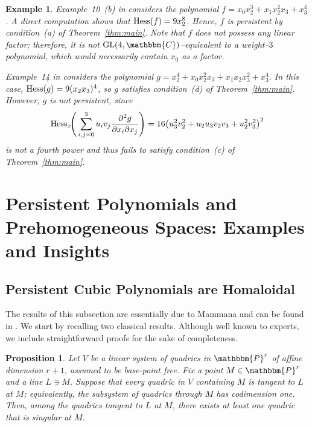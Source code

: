 \documentclass[aps,floatfix,groupedaddress,superscriptaddress,longbibliography,footinbib,notitlepage,showpacs]{revtex4-1}
\def\Hess{{\rm Hess}}
\newtheorem{proposition}[theorem]{Proposition}
\newtheorem{example}[theorem]{Example}
\begin{document}
\begin{example}\label{exa:SolT}
Example~10~(b) in \cite{SolT} considers the polynomial $f = x_0x_2^3 + x_1x_2^2x_3 + x_3^4$. A direct computation shows that $\Hess(f) = 9x_2^8$. Hence, $f$ is persistent by condition~\textnormal{(a)} of Theorem~\ref{thm:main}. Note that $f$ does not possess any linear factor; therefore, it is not 
$\mathrm{GL}(4,\mathbbm{C})$–equivalent to a weight–$3$ polynomial, which would necessarily contain $x_0$ as a factor.

Example~14 in \cite{SolT} considers the polynomial $g = x_2^4 + x_0x_2^2x_3 + x_1x_2x_3^2 + x_3^4$. In this case, $\Hess(g) = 9(x_2x_3)^4$, so $g$ satisfies condition~\textnormal{(d)} of Theorem~\ref{thm:main}. However, $g$ is not persistent, since
\[
\Hess_x\!\Bigg(\sum_{i,j=0}^3 u_i v_j 
\frac{\partial^2 g}{\partial x_i \partial x_j}\Bigg)
= 16\big(u_3^2 v_2^2 + u_2u_3v_2v_3 + u_2^2v_3^2\big)^2
\]
is not a fourth power and thus fails to satisfy condition~\textnormal{(c)} of Theorem~\ref{thm:main}.
\end{example}
\section{Persistent Polynomials and Prehomogeneous Spaces: Examples and Insights}\label{sec.v}


\subsection{Persistent Cubic Polynomials are Homaloidal }

The results of this subsection are essentially due to Mammana and can be found in \cite[n.6]{Mam}.
We start by recalling two classical results. Although well known to experts, we include straightforward proofs for the sake of completeness.

\begin{proposition}\label{prop:contains_line}
Let $V$ be a linear system of quadrics in $\mathbbm{P}^r$ of affine dimension $r+1$, assumed to be base-point free. Fix a point $M\in\mathbbm{P}^r$ and a line $L\ni M$. Suppose that every quadric in $V$ containing $M$ is tangent to $L$ at $M$; equivalently, the subsystem of quadrics through $M$ has codimension one. Then, among the quadrics tangent to $L$ at $M$, there exists at least one quadric that is singular at $M$.
\end{proposition}
\end{document}
